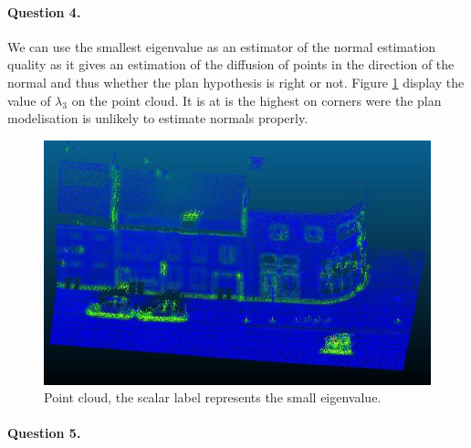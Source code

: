 \documentclass[french]{article}
\begin{document}
\paragraph{Question 4.} We can use the smallest eigenvalue as an estimator of the normal estimation quality as it gives an estimation of the diffusion of points in the direction of the normal and thus whether the plan hypothesis is right or not. Figure \ref{fig:q4} display the value of $\lambda_3$ on the point cloud. It is at is the highest on corners were the plan modelisation  is unlikely to estimate normals properly.

\begin{figure}[h]
	\centering
	\includegraphics[width=0.6\linewidth]{q4.jpg}
	\caption{Point cloud, the scalar label represents the small eigenvalue.}
	\label{fig:q4}
\end{figure}


\paragraph{Question 5.} 
\end{document}
